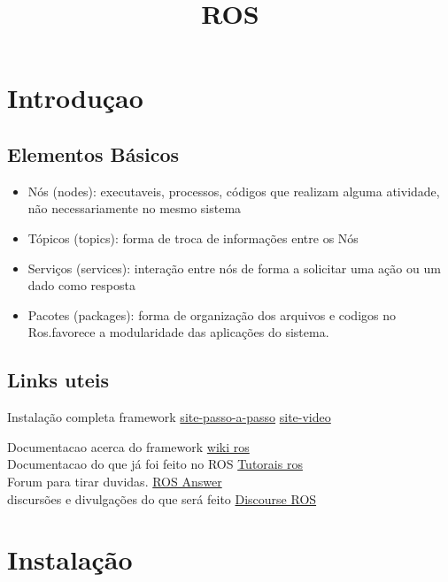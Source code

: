 \documentclass[letterpaper]{article}
\date{} %
\title{\textbf{ROS}}
\begin{document}
\maketitle
\tableofcontents
\newpage
\section{Introduçao}

\subsection{Elementos Básicos}
\begin{itemize}
    \item Nós (nodes): executaveis, processos, códigos que realizam alguma atividade, não necessariamente no mesmo sistema
    \item Tópicos (topics): forma de troca de informações entre os Nós
    \item Serviços (services): interação entre nós de forma a solicitar uma ação ou um dado como resposta
    \item Pacotes (packages): forma de organização dos arquivos e codigos no Ros.favorece a modularidade das aplicações do sistema.
\end{itemize}

\subsection{Links uteis}
Instalação completa framework 
\href{https://emanual.robotis.com/docs/en/platform/turtlebot3/quick-start/#pc-setup}{site-passo-a-passo}
\href{https://youtu.be/cMuhUsItOtQ?si=160sPFJVYM5XW0wg--}{site-video}

Documentacao acerca do framework  
\href{https://wiki.ros.org/}{wiki ros}\\

Documentacao do que já foi feito no ROS
\href{https://wiki.ros.org/Tutorials/}{Tutorais ros} \\

Forum para tirar duvidas.
\href{https://answers.ros.org/}{ROS Answer}\\

discursões e divulgações do que será feito  
\href{https://discourse.ros.org/}{Discourse ROS}\\
\section{Instalação}
\end{document}
